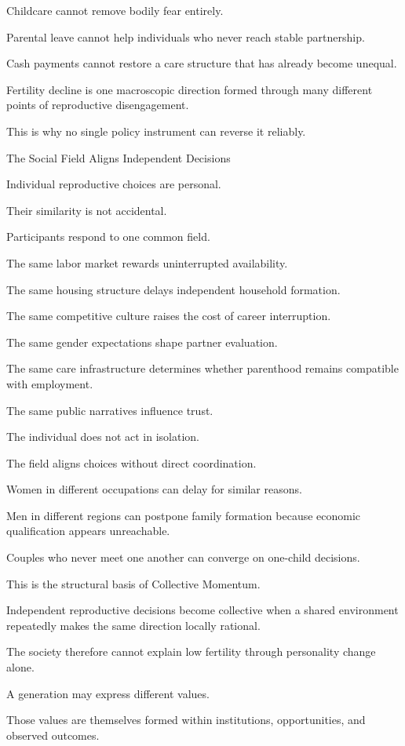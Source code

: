 Childcare cannot remove bodily fear entirely.

Parental leave cannot help individuals who never reach stable partnership.

Cash payments cannot restore a care structure that has already become unequal.

Fertility decline is one macroscopic direction formed through many different points of reproductive disengagement.

This is why no single policy instrument can reverse it reliably.

The Social Field Aligns Independent Decisions

Individual reproductive choices are personal.

Their similarity is not accidental.

Participants respond to one common field.

The same labor market rewards uninterrupted availability.

The same housing structure delays independent household formation.

The same competitive culture raises the cost of career interruption.

The same gender expectations shape partner evaluation.

The same care infrastructure determines whether parenthood remains compatible with employment.

The same public narratives influence trust.

The individual does not act in isolation.

The field aligns choices without direct coordination.

Women in different occupations can delay for similar reasons.

Men in different regions can postpone family formation because economic qualification appears unreachable.

Couples who never meet one another can converge on one-child decisions.

This is the structural basis of Collective Momentum.

Independent reproductive decisions become collective when a shared environment repeatedly makes the same direction locally rational.

The society therefore cannot explain low fertility through personality change alone.

A generation may express different values.

Those values are themselves formed within institutions, opportunities, and observed outcomes.

